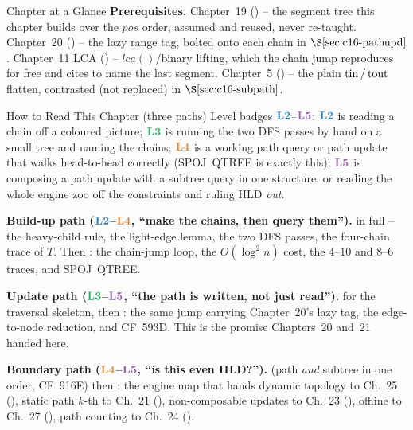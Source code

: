 \begin{chaptertheorybox}{Chapter at a Glance}
\textbf{Prerequisites.} Chapter~19 () -- the segment tree this chapter
builds over the \(\mathit{pos}\) order, assumed and reused, never re-taught.  Chapter~20
() -- the lazy range tag, bolted onto each chain in \(\secref{c16-pathupd}\).
Chapter~11 LCA () -- \(\mathit{lca}()/\)binary lifting, which the chain
jump reproduces for free and cites to name the last segment.  Chapter~5
() -- the plain \(\operatorname{tin}/\operatorname{tout}\) flatten, contrasted (not replaced) in
\(\secref{c16-subpath}\).
\end{chaptertheorybox}

\begin{chaptertheorybox}{How to Read This Chapter (three paths)}
Level badges \(\lv2\)--\(\lv5\): \(\lv2\) is reading a chain off a coloured
picture; \(\lv3\) is running the two DFS passes by hand on a small tree and
naming the chains; \(\lv{4}\) is a working path query or path update that walks
head-to-head correctly (SPOJ~QTREE is exactly this); \(\lv{5}\) is composing a
path update with a subtree query in one structure, or reading the whole engine
zoo off the constraints and ruling HLD \emph{out}.

\textbf{Build-up path (\(\lv2\)--\(\lv4\), ``make the chains, then query them'').}
 in full -- the heavy-child rule, the light-edge lemma, the two
DFS passes, the four-chain trace of \(T\).  Then : the
chain-jump loop, the \(O(\log^2 n)\) cost, the \(4\text{--}10\) and \(8\text{--}6\)
traces, and SPOJ~QTREE.

\textbf{Update path (\(\lv3\)--\(\lv{5}\), ``the path is written, not just read'').}
 for the traversal skeleton, then : the same
jump carrying Chapter~20's lazy tag, the edge-to-node reduction, and CF~593D.  This
is the promise Chapters~20 and~21 handed here.

\textbf{Boundary path (\(\lv{4}\)--\(\lv{5}\), ``is this even HLD?'').}
 (path \emph{and} subtree in one order, CF~916E) then
: the engine map that hands dynamic topology to Ch.~25
(), static path \(k\)-th to Ch.~21 (), non-composable
updates to Ch.~23 (), offline to Ch.~27 (), path counting
to Ch.~24 ().
\end{chaptertheorybox}

